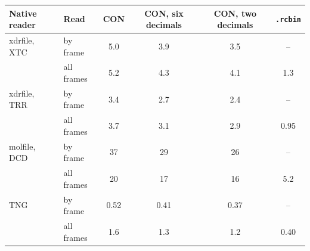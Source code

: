 \begin{tabular}{@{}llcccc@{}}
\toprule
Native reader & Read & CON & CON, six decimals & CON, two decimals & \texttt{.rcbin}\\
\midrule
xdrfile, XTC & by frame & 5.0 & 3.9 & 3.5 & --\\
 & all frames & 5.2 & 4.3 & 4.1 & 1.3\\
\addlinespace
xdrfile, TRR & by frame & 3.4 & 2.7 & 2.4 & --\\
 & all frames & 3.7 & 3.1 & 2.9 & 0.95\\
\addlinespace
molfile, DCD & by frame & 37 & 29 & 26 & --\\
 & all frames & 20 & 17 & 16 & 5.2\\
\addlinespace
TNG & by frame & 0.52 & 0.41 & 0.37 & --\\
 & all frames & 1.6 & 1.3 & 1.2 & 0.40\\
\bottomrule
\end{tabular}
